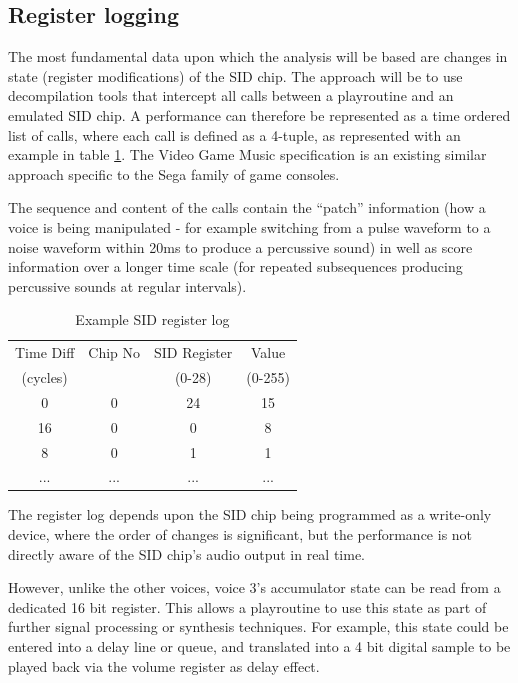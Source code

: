 \documentclass[10pt]{article}
\begin{document}
\begin{multicols*}{2}
\subsection{Register logging}
\label{reglog}

The most fundamental data upon which the analysis will be based are changes in state (register modifications) of the SID chip. The approach will be to use decompilation tools that intercept all calls between a playroutine and an emulated SID chip. A performance can therefore be represented as a time ordered list of calls, where each call is defined as a 4-tuple, as represented with an example in table \ref{table:examplelog}. The Video Game Music\cite{vgmspec} specification is an existing similar approach specific to the Sega family of game consoles.

The sequence and content of the calls contain the “patch” information (how a voice is being manipulated - for example switching from a pulse waveform to a noise waveform within 20ms  to produce a percussive sound) in well as score information over a longer time scale (for repeated subsequences producing percussive sounds at regular intervals).

\begin{table}
    \begin{tabular}{|c|c|c|c|}
        \hline
        \rule[-1ex]{0pt}{2.5ex} Time Diff & Chip No & SID Register & Value \\
        \rule[-1ex]{0pt}{2.5ex} (cycles) & & (0-28) & (0-255) \\
        \hline
        \rule[-1ex]{0pt}{2.5ex} 0 & 0 & 24 & 15 \\
        \hline
        \rule[-1ex]{0pt}{2.5ex} 16 & 0 & 0 & 8 \\
        \hline
        \rule[-1ex]{0pt}{2.5ex} 8 & 0 & 1 & 1 \\
        \hline
        \rule[-1ex]{0pt}{2.5ex} ... & ... & ... & ... \\
        \hline
    \end{tabular}
    \caption{Example SID register log}
    \label{table:examplelog}
\end{table}

The register log depends upon the SID chip being programmed as a write-only device, where the order of changes is significant, but the performance is not directly aware of the SID chip’s audio output in real time.

However, unlike the other voices, voice 3’s accumulator state can be read from a dedicated 16 bit register. This allows a playroutine to use this state as part of further signal processing or synthesis techniques. For example, this state could be entered into a delay line or queue, and translated into a 4 bit digital sample to be played back via the volume register as delay effect.


\end{multicols*}
\end{document}
